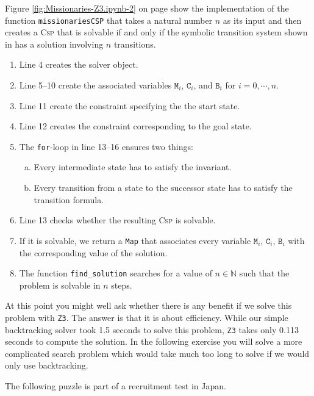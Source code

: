 Figure \ref{fig:Missionaries-Z3.ipynb-2} on page \pageref{fig:Missionaries-Z3.ipynb-2} show the implementation
of the function \texttt{missionariesCSP} that takes a natural number $n$ as its input and then creates a
\textsc{Csp} that is solvable if and only if the symbolic transition system shown in
 has a solution involving $n$ transitions.
\begin{enumerate}
\item Line 4 creates the solver object.
\item Line 5--10 create the associated variables $\mathtt{M}_i$, $\mathtt{C}_i$, and $\mathtt{B}_i$
      for $i=0, \cdots, n$.
\item Line 11 create the constraint specifying the the start state.    
\item Line 12 creates the constraint corresponding to the goal state.
\item The \texttt{for}-loop in line 13--16 ensures two things:
  \begin{enumerate}[(a)]
  \item Every intermediate state has to satisfy the invariant.
  \item Every transition from a state to the successor state has to satisfy the transition formula.
  \end{enumerate}
\item Line 13 checks whether the resulting \textsc{Csp} is solvable.
\item If it is solvable, we return a \texttt{Map} that associates every variable $\texttt{M}_i$,  $\texttt{C}_i$,
      $\texttt{B}_i$ with the corresponding value of the solution.
\item The function \texttt{find\_solution} searches for a value of $n \in \mathbb{N}$ such that the problem is
      solvable in $n$ steps.
\end{enumerate}
At this point you might well ask whether there is any benefit if we solve this problem with \texttt{Z3}.  The
answer is that it is about efficiency.  While our simple backtracking solver took 1.5 seconds to solve this
problem, \texttt{Z3} takes only 0.113 seconds to compute the solution.  In the following exercise you will
solve a more complicated search problem which would take much too long to solve if we would only use backtracking.


\exerciseEng
The following puzzle is part of a recruitment test in Japan.

